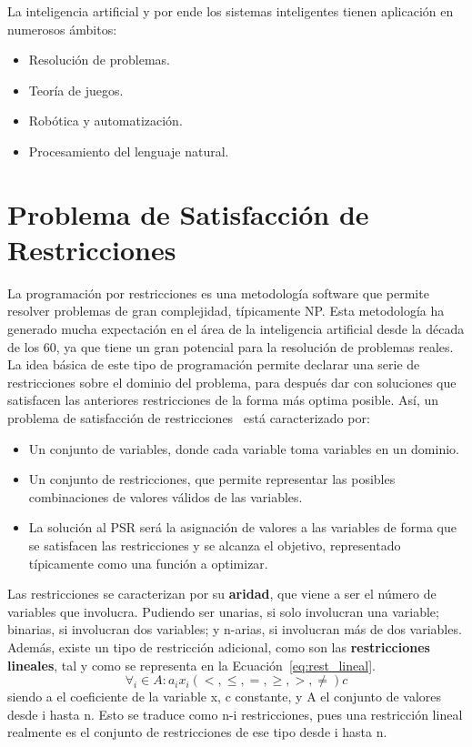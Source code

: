La inteligencia artificial y por ende los sistemas inteligentes tienen aplicación en numerosos ámbitos:
\begin{itemize}
\item{Resolución de problemas.}
\item{Teoría de juegos.}
\item{Robótica y automatización.}
\item{Procesamiento del lenguaje natural.}
\end{itemize}

\section{Problema de Satisfacción de Restricciones}
La programación por restricciones es una metodología software que permite resolver problemas de gran complejidad, típicamente NP. Esta metodología ha generado mucha expectación en el área de la inteligencia artificial desde la década de los 60, ya que tiene un gran potencial para la resolución de problemas reales. La idea básica de este tipo de programación permite declarar una serie de restricciones sobre el dominio del problema, para después dar con soluciones que satisfacen las anteriores restricciones de la forma más optima posible. Así, un problema de satisfacción de restricciones~\cite{Russ06} está caracterizado por:
\begin{itemize}
	\item Un conjunto de variables, donde cada variable toma variables en un dominio.
	\item Un conjunto de restricciones, que permite representar las posibles combinaciones de valores válidos de las variables.
	\item La solución al \gls{PSR} será la asignación de valores a las variables de forma que se satisfacen las restricciones y se alcanza el objetivo, representado típicamente como una función a optimizar.
\end{itemize}
Las restricciones se caracterizan por su \textbf{aridad}, que viene a ser el número de variables que involucra. Pudiendo ser unarias, si solo involucran una variable; binarias, si involucran dos variables; y n-arias, si involucran más de dos variables. Además, existe un tipo de restricción adicional, como son las \textbf{restricciones lineales}, tal y como se representa en la Ecuación~\ref{eq:rest_lineal}.
\begin{equation}
  \label{eq:rest_lineal}
  \forall_{i} \in A :  a_{i}x_{i} (<,\leq,=,\geq,>,\neq) c
\end{equation}
siendo a el coeficiente de la variable x, c constante, y A el conjunto de valores desde i hasta n. Esto se traduce como n-i restricciones, pues una restricción lineal realmente es el conjunto de restricciones de ese tipo desde i hasta n.\\
